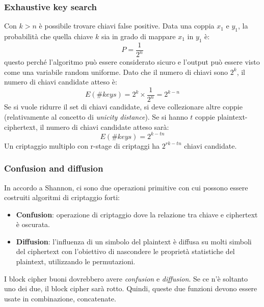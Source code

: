 \documentclass[a4paper,12pt]{article}
\begin{document}
\subsubsection{Exhaustive key search}
Con $k > n$ è possibile trovare chiavi false positive. Data una coppia $x_1$ e $y_1$, la probabilità che quella chiave $k$ sia in grado di mappare $x_1$ in $y_1$ è:
$$ P = \frac{1}{2^n} $$
questo perché l'algoritmo può essere considerato sicuro e l'output può essere visto come una variabile random uniforme.
Dato che il numero di chiavi sono $2^k$, il numero di chiavi candidate atteso è: 
$$ E(\#keys) = 2^k \times \frac{1}{2^n} = 2^{k-n}$$
Se si vuole ridurre il set di chiavi candidate, si deve collezionare altre coppie (relativamente al concetto di \textit{unicity distance}). Se si hanno $t$ coppie plaintext-ciphertext, il numero di chiavi candidate atteso sarà:
$$ E(\#keys) = 2^{k-tn} $$
Un criptaggio multiplo con r-stage di criptaggi ha $2^{rk-tn}$ chiavi candidate.

\subsubsection{Confusion and diffusion}
In accordo a Shannon, ci sono due operazioni primitive con cui possono essere costruiti algoritmi di criptaggio forti:
\begin{itemize}							
	\item \textbf{Confusion}: operazione di criptaggio dove la relazione tra chiave e ciphertext è oscurata.
	\item \textbf{Diffusion}: l'influenza di un simbolo del plaintext è diffusa su molti simboli del ciphertext con l'obiettivo di nascondere le proprietà statistiche del plaintext, utilizzando le permutazioni.
\end{itemize}
I block cipher buoni dovrebbero avere \textit{confusion} e \textit{diffusion}. Se ce n'è soltanto uno dei due, il block cipher sarà rotto.
Quindi, queste due funzioni devono essere usate in combinazione, concatenate.
\end{document}
